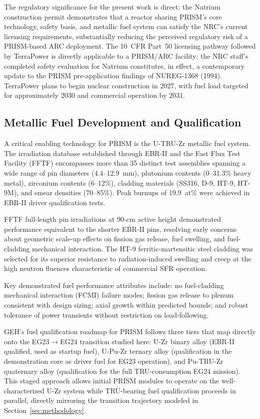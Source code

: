 \documentclass[10pt,twoside]{article}
\begin{document}
The regulatory significance for the present work is direct: the Natrium
construction permit demonstrates that a reactor sharing PRISM's core
technology, safety basis, and metallic fuel system can satisfy the NRC's
current licensing requirements, substantially reducing the perceived
regulatory risk of a PRISM-based ARC deployment.  The 10~CFR Part~50
licensing pathway followed by TerraPower is directly applicable to a
PRISM/ARC facility; the NRC staff's completed safety evaluation for
Natrium constitutes, in effect, a contemporary update to the PRISM
pre-application findings of NUREG-1368 (1994).  TerraPower plans to
begin nuclear construction in 2027, with fuel load targeted for
approximately 2030 and commercial operation by 2031.

\subsection{Metallic Fuel Development and Qualification}

A critical enabling technology for PRISM is the U-TRU-Zr metallic fuel
system.  The irradiation database established through EBR-II and the
Fast Flux Test Facility (FFTF) encompasses more than 35 distinct test
assemblies spanning a wide range of pin diameters (4.4--12.9~mm),
plutonium contents (0--31.3\% heavy metal), zirconium contents (6--12\%),
cladding materials (SS316, D-9, HT-9, HT-9M), and smear densities
(70--85\%).  Peak burnups of 19.9~at\% were achieved in EBR-II driver
qualification tests.\cite{Till2011,Triplett2010}

FFTF full-length pin irradiations at 90-cm active height demonstrated
performance equivalent to the shorter EBR-II pins, resolving early concerns
about geometric scale-up effects on fission gas release, fuel swelling, and
fuel-cladding mechanical interaction.\cite{Till2011}  The HT-9 ferritic-martensitic
steel cladding was selected for its superior resistance to radiation-induced
swelling and creep at the high neutron fluences characteristic of commercial
SFR operation.\cite{Triplett2012,Hoang2022}

Key demonstrated fuel performance attributes include: no fuel-cladding
mechanical interaction (FCMI) failure modes; fission gas release to plenum
consistent with design sizing; axial growth within predicted bounds; and
robust tolerance of power transients without restriction on load-following.

GEH's fuel qualification roadmap for PRISM follows three tiers that map
directly onto the EG23$\rightarrow$EG24 transition studied here: U-Zr
binary alloy (EBR-II qualified, used as startup fuel), U-Pu-Zr ternary
alloy (qualification in the demonstration core as driver fuel for EG23
operation), and Pu-TRU-Zr quaternary alloy (qualification for the full
TRU-consumption EG24 mission).~\cite{Triplett2010}  This staged approach
allows initial PRISM modules to operate on the well-characterized U-Zr
system while TRU-bearing fuel qualification proceeds in parallel,
directly mirroring the transition trajectory modeled in
Section~\ref{sec:methodology}.
\end{document}
